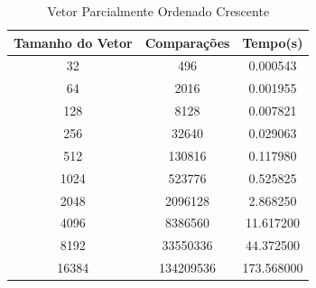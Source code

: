 \documentclass[12pt,a4paper,twoside]{report}
\begin{document}
\begin{table}[h]
  \centering
  \caption{Vetor Parcialmente Ordenado Crescente \label{tab:poc}}
  \begin{tabular}{ccc} \\\hline
  \textbf{Tamanho do Vetor} & \textbf{Comparações} & \textbf{Tempo(s)} \\\hline
  32                        & 496                  & 0.000543          \\\hline
  64                        & 2016                 & 0.001955          \\\hline
  128                       & 8128                 & 0.007821          \\\hline
  256                       & 32640                & 0.029063          \\\hline
  512                       & 130816               & 0.117980          \\\hline
  1024                      & 523776               & 0.525825          \\\hline
  2048                      & 2096128              & 2.868250          \\\hline
  4096                      & 8386560              & 11.617200         \\\hline
  8192                      & 33550336             & 44.372500        \\\hline
  16384                     & 134209536            & 173.568000        \\\hline
  \end{tabular}
\end{table}
\end{document}
